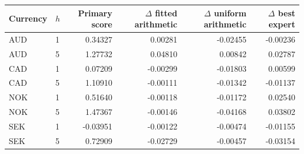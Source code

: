 \begin{tabular}{llrrrr}\toprule
Currency & $h$ & Primary score & $\Delta$ fitted arithmetic & $\Delta$ uniform arithmetic & $\Delta$ best expert\\\midrule
AUD & 1 & 0.34327 & 0.00281 & -0.02455 & -0.00236\\
AUD & 5 & 1.27732 & 0.04810 & 0.00842 & 0.02787\\
CAD & 1 & 0.07209 & -0.00299 & -0.01803 & 0.00599\\
CAD & 5 & 1.10910 & -0.00111 & -0.01342 & -0.01137\\
NOK & 1 & 0.51640 & -0.00118 & -0.01172 & 0.02540\\
NOK & 5 & 1.47367 & -0.00146 & -0.04168 & 0.03802\\
SEK & 1 & -0.03951 & -0.00122 & -0.00474 & -0.01155\\
SEK & 5 & 0.72909 & -0.02729 & -0.00457 & -0.03154\\
\bottomrule\end{tabular}
